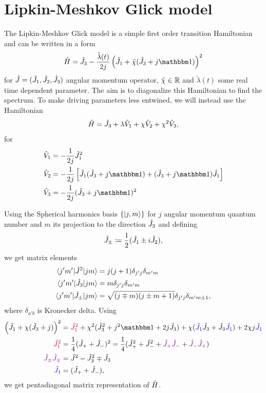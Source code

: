 \chapter{Lipkin-Meshkov Glick model}
The Lipkin-Meshkov Glick model is a simple first order transition Hamiltonian and can be written in a form
\begin{equation}
    \HH=\J_3-\frac{\tilde\lambda(t)}{2j}\left(\J_1+\tilde\chi(\J_3+j\Id)\right)^2
    \label{eq:firstOrderTransitionHamiltonianOriginal}
\end{equation}
for $\hat{J}=(\hat{J}_1,\hat{J}_2,\hat{J}_3)$ angular momentum operator, $\tilde\chi\in\mathbb{R}$ and $\tilde\lambda(t)$ some real time dependent parameter. The aim is to diagonalize this Hamiltonian to find the spectrum. To make driving parameters less entwined, we will instead use the Hamiltonian
\begin{equation}
    \hat{H}=\hat{J}_3+\lambda\hat V_1 +\chi \hat V_2+\chi^2 \hat V_3,
    \label{eq:firstOrderTransitionHamiltonian}
\end{equation}
for
\begin{align}
    \hat V_1 &=-\frac{1}{2j}\J_1^2\\
    \hat V_2 &= -\frac{1}{2j}\left[\J_1(\J_3+j\Id)+(\J_3+j\Id)\J_1\right]\\
    \hat V_3 &= -\frac{1}{2j}(\J_3+j\Id)^2
\end{align}



Using the Spherical harmonics basis $\{\ket{j,m}\}$ for $j$ angular momentum quantum number and $m$ its projection to the direction $\hat{J}_3$ and defining
\begin{equation}
    \hat{J}_\pm\coloneqq\frac{1}{2}(\hat{J}_1\pm i\hat{J}_2),
\end{equation}
we get matrix elements
\begin{align}
    \braket{j'm'|\hat{J}^2|jm} &= j(j+1)\delta_{j'j}\delta_{m'm}\\
    \braket{j'm'|\hat{J}_3|jm} &= m \delta_{j'j}\delta_{m'm}\\
    \braket{j'm'|\hat{J}_\pm|jm} &= \sqrt{(j\mp m)(j\pm m+1)}\delta_{j'j}\delta_{m'm\pm 1},
\end{align}
where $\delta_{a'b}$ is Kronecker delta. Using
\begin{align}
        \left(\J_1+\chi(\J_3+j)\right)^2 &= \textcolor{purple}{\J_1^2} +\chi^2 (\J_3^2+j^2\Id+2j\J_3)+\chi(\textcolor{blue}{\J_1}\J_3+\J_3\textcolor{blue}{\J_1})+2\chi j\textcolor{blue}{\J_1}\\
        \textcolor{purple}{\J_1^2}&= \frac{1}{4}(\J_++\J_-)^2= \frac{1}{4}(\J_+^2+\J_-^2+\textcolor{violet}{\J_+\J_-}+\textcolor{violet}{\J_-\J_+})\\ 
        \textcolor{violet}{\J_\pm\J_\mp}&=\J^2-\J_3^2 \mp \J_3\\
        \textcolor{blue}{\J_1}&=(\J_+ +\J_-),
\end{align}
we get pentadiagonal matrix representation of $\hat{H}$. 

